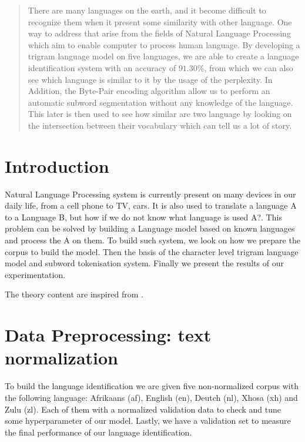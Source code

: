 \begin{abstract}
There are many languages on the earth, and it become difficult to recognize them when it present some similarity with other language. One way to address that arise from the fields of Natural Language Processing which aim to enable computer to process human language. By developing a trigram language model on five languages, we are able to create a language identification system with an accuracy of $91.30\%$, from which we can also see which language is similar to it by the usage of the perplexity. In Addition, the Byte-Pair encoding algorithm allow us to perform an automatic subword segmentation without any knowledge of the language. This later is then used to see how similar are two language by looking on the intersection between their vocabulary which can tell us a lot of story.

\end{abstract}
\section{Introduction}
Natural Language Processing system is currently present on many devices in our daily life, from a cell phone to TV, cars. It is also used to translate a language A to a Language B, but how if we do not know what language is used A?. This problem can be solved by building a Language model based on known languages and process the A on them. To build such system, we look on how we prepare the corpus to build the model. Then the basis of the character level trigram language model and subword tokenisation system. Finally we present the results of our experimentation.

\medskip
The theory content are inspired from \cite{kamper2022nlp817, jurafsky2022speech}.
\section{Data Preprocessing: text normalization}
To build the language identification we are given five non-normalized corpus with the following language: Afrikaans (af), English (en), Deutch (nl), Xhosa (xh) and Zulu (zl).
Each of them with a normalized validation data to check and tune some hyperparameter of our model. Lastly, we have a validation set to measure the final performance of our language identification.

